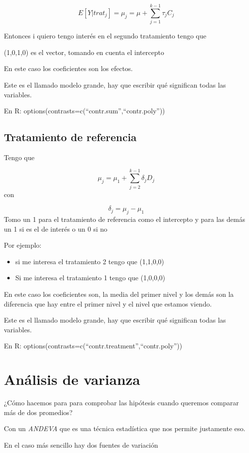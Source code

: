 \documentclass[
]{article}
\begin{document}
\[
E[Y|trat_j]=\mu_j=\mu+\sum^{k-1}_{j=1}\tau_jC_j
\]

Entonces i quiero tengo interés en el segundo tratamiento tengo que

(1,0,1,0) es el vector, tomando en cuenta el intercepto

En este caso los coeficientes son los efectos.

Este es el llamado modelo grande, hay que escribir qué significan todas
las variables.

En R: options(contrasts=c(``contr.sum'',``contr.poly''))

\subsection{Tratamiento de referencia}\label{tratamiento-de-referencia}

Tengo que

\[
\mu_j=\mu_1+\sum^{k-1}_{j=2}\delta_jD_j
\] con

\[
\delta_j=\mu_j-\mu_1
\] Tomo un 1 para el tratamiento de referencia como el intercepto y para
las demás un 1 si es el de interés o un 0 si no

Por ejemplo:

\begin{itemize}
\item
  si me interesa el tratamiento 2 tengo que (1,1,0,0)
\item
  Si me interesa el tratamiento 1 tengo que (1,0,0,0)
\end{itemize}

En este caso los coeficientes son, la media del primer nivel y los demás
son la diferencia que hay entre el primer nivel y el nivel que estamos
viendo.

Este es el llamado modelo grande, hay que escribir qué significan todas
las variables.

En R: options(contrasts=c(``contr.treatment'',``contr.poly''))

\section{Análisis de varianza}\label{anuxe1lisis-de-varianza}

¿Cómo hacemos para para comprobar las hipótesis cuando queremos comparar
más de dos promedios?

Con un \emph{ANDEVA} que es una técnica estadística que nos permite
justamente eso.

En el caso más sencillo hay dos fuentes de variación
\end{document}
